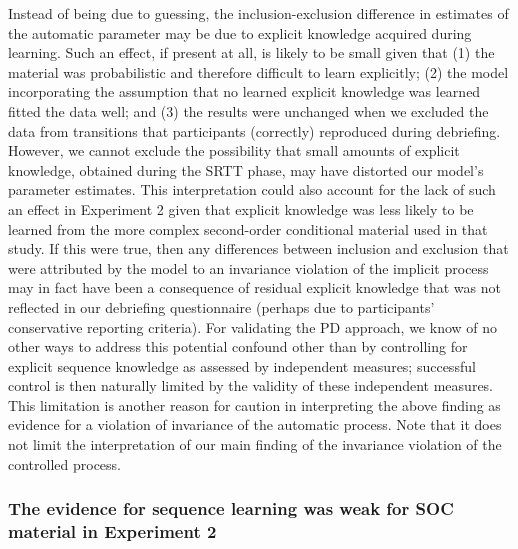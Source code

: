 \documentclass[floatsintext,man]{apa6}
\begin{document}
Instead of being due to guessing, the inclusion-exclusion difference in
estimates of the automatic parameter may be due to explicit knowledge
acquired during learning. Such an effect, if present at all, is likely
to be small given that (1) the material was probabilistic and therefore
difficult to learn explicitly; (2) the model incorporating the
assumption that no learned explicit knowledge was learned fitted the
data well; and (3) the results were unchanged when we excluded the data
from transitions that participants (correctly) reproduced during
debriefing. However, we cannot exclude the possibility that small
amounts of explicit knowledge, obtained during the SRTT phase, may have
distorted our model's parameter estimates. This interpretation could
also account for the lack of such an effect in Experiment 2 given that
explicit knowledge was less likely to be learned from the more complex
second-order conditional material used in that study. If this were true,
then any differences between inclusion and exclusion that were
attributed by the model to an invariance violation of the implicit
process may in fact have been a consequence of residual explicit
knowledge that was not reflected in our debriefing questionnaire
(perhaps due to participants' conservative reporting criteria). For
validating the PD approach, we know of no other ways to address this
potential confound other than by controlling for explicit sequence
knowledge as assessed by independent measures; successful control is
then naturally limited by the validity of these independent measures.
This limitation is another reason for caution in interpreting the above
finding as evidence for a violation of invariance of the automatic
process. Note that it does not limit the interpretation of our main
finding of the invariance violation of the controlled process.

\subsubsection{The evidence for sequence learning was weak for SOC
material in Experiment
2}\label{the-evidence-for-sequence-learning-was-weak-for-soc-material-in-experiment-2}
\end{document}
